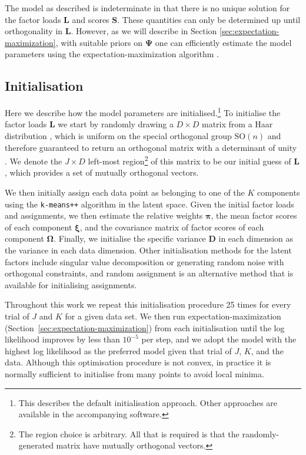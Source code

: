 \documentclass[twocolumn]{aastex62}
\newcommand{\vect}[1]{\boldsymbol{\mathbf{#1}}}
\renewcommand{\vec}[1]{\vect{#1}}
\newcommand{\factorloads}{\textbf{L}}
\newcommand{\factorscores}{\textbf{S}}
\newcommand{\specificvariance}{\vec{D}}
\newcommand{\scoremeans}{\vec\xi}
\newcommand{\scorecovs}{\vec\Omega}
\newcommand{\NumDimensions}{D}
\newcommand{\NumLatentFactors}{J}
\newcommand{\NumComponents}{K}
\begin{document}
The model as described is indeterminate in that there is no unique 
solution for the factor loads $\factorloads$ and scores
$\factorscores$. These quantities can only be determined up until 
orthogonality in $\factorloads$. However, as we will describe in Section \ref{sec:expectation-maximization}, with suitable priors on $\vec\Psi$ 
one can efficiently estimate the model parameters using the expectation-maximization
algorithm \citep{Dempster:1977}. 

\subsection{Initialisation} \label{sec:initialisation}

Here we describe how the model parameters are initialised.\footnote{This describes the default initialisation approach. Other approaches are available in the accompanying software.}
To initialise the factor loads $\factorloads$ we start by randomly drawing a $\NumDimensions \times \NumDimensions$ matrix from a Haar distribution \citep{Haar:1933},
which is uniform on the special orthogonal group $\textrm{SO}(n)$ and therefore guaranteed to return an orthogonal
matrix with a determinant of unity \citep{Stewart:1980}.
We denote the $\NumLatentFactors \times \NumDimensions$ left-most region\footnote{The region choice is arbitrary. All that is required is that the randomly-generated matrix have mutually orthogonal vectors.}
 of this
matrix to be our initial guess of $\factorloads$, which provides a set of mutually
orthogonal vectors.

We then initially assign each data point as belonging to one of the
$\NumComponents$ components using the \texttt{k-means++} algorithm \citep{Arthur:2007}
in the latent space. Given the initial
factor loads and assignments, we then estimate the relative weights
$\vec\pi$, the mean factor scores of each component $\scoremeans$, and
the covariance matrix of factor scores of each component $\scorecovs$.
Finally, we initialise the specific variance $\specificvariance$ in each
dimension as the variance in each data dimension. Other initialisation 
methods for the latent factors include singular value decomposition \citep{Golub:1970}
or generating random noise with orthogonal constraints, and random assignment
is an alternative method that is available for initialising assignments.

Throughout this work we repeat this initialisation procedure 25 times for
every trial of $\NumLatentFactors$ and $\NumComponents$ for a given data set. 
We then run expectation-maximization (Section~\ref{sec:expectation-maximization})
from each initialisation until the log likelihood improves by less than $10^{-5}$
per step, and we adopt the model with the highest log likelihood as the preferred 
model given that trial of $\NumLatentFactors$, $\NumComponents$, and the data. Although
this optimisation procedure is not convex, in practice it is normally sufficient to
initialise from many points to avoid local minima.
\end{document}
